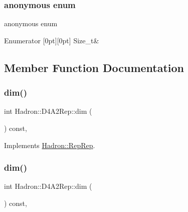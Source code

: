 \subsubsection{\texorpdfstring{anonymous enum}{anonymous enum}}
{\footnotesize\ttfamily anonymous enum}

\begin{DoxyEnumFields}{Enumerator}
[0pt][0pt]{}\mbox{\label{structHadron_1_1D4A2Rep_aef1c15e876c460be5bc2f5d89e92f71fa366b0aa803a0f1ed0a3fda4fa8e2ad3d}} 
Size\+\_\+t&\\
\hline

\end{DoxyEnumFields}


\subsection{Member Function Documentation}
\mbox{\label{structHadron_1_1D4A2Rep_adc6df0a40f7af491e096e53145f91543}} 
\subsubsection{\texorpdfstring{dim()}{dim()}\hspace{0.1cm}{\footnotesize\ttfamily [1/5]}}
{\footnotesize\ttfamily int Hadron\+::\+D4\+A2\+Rep\+::dim (\begin{DoxyParamCaption}{ }\end{DoxyParamCaption}) const\hspace{0.3cm}{\ttfamily [inline]}, {\ttfamily [virtual]}}



Implements \mbox{\hyperlink{structHadron_1_1RepRep_a92c8802e5ed7afd7da43ccfd5b7cd92b}{Hadron\+::\+Rep\+Rep}}.

\mbox{\label{structHadron_1_1D4A2Rep_adc6df0a40f7af491e096e53145f91543}} 
\subsubsection{\texorpdfstring{dim()}{dim()}\hspace{0.1cm}{\footnotesize\ttfamily [2/5]}}
{\footnotesize\ttfamily int Hadron\+::\+D4\+A2\+Rep\+::dim (\begin{DoxyParamCaption}{ }\end{DoxyParamCaption}) const\hspace{0.3cm}{\ttfamily [inline]}, {\ttfamily [virtual]}}



